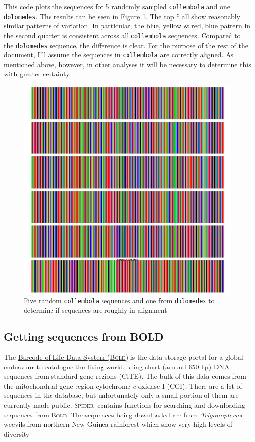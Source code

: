 \documentclass{article}
\newcommand{\spider}{\textsc{Spider}~} %
\newcommand{\scinm}{\emph}
\newcommand{\progname}[1]{\textsc{#1}}
\newcommand{\fun}[1]{\texttt{#1}}
\begin{document}
This code plots the sequences for 5 randomly sampled \fun{collembola} and one \fun{dolomedes}. The results can be seen in Figure \ref{seeBarcode.fig}. The top 5 all show reasonably similar patterns of variation. In particular, the blue, yellow \& red, blue pattern in the second quarter is consistent across all \fun{collembola} sequences. Compared to the \fun{dolomedes} sequence, the difference is clear. For the purpose of the rest of the document, I'll assume the sequences in \fun{collembola} are correctly aligned. As mentioned above, however, in other analyses it will be necessary to determine this with greater certainty.

\begin{figure}[tbp]
	\includegraphics[width=\textwidth]{seeBarcode}
	\caption{Five random \fun{collembola} sequences and one from \fun{dolomedes} to determine if sequences are roughly in alignment}
	\label{seeBarcode.fig}
\end{figure}



\subsection{Getting sequences from BOLD}
\label{BOLD.section}
The \href{http://www.barcodinglife.com}{Barcode of Life Data System (\progname{Bold})} is the data storage portal for a global endeavour to catalogue the living world, using short (around 650 bp) DNA sequences from standard gene regions (CITE). The bulk of this data comes from the mitochondrial gene region cytochrome \emph{c} oxidase I (COI). There are a lot of sequences in the database, but unfortunately only a small portion of them are currently made public. \spider contains functions for searching and downloading sequences from \progname{Bold}. The sequences being downloaded are from \scinm{Trigonopterus} weevils from northern New Guinea rainforest which show very high levels of diversity \citep{Ried.etal.2010,Ried.2010}
\end{document}
